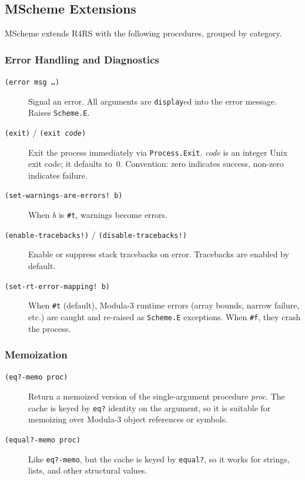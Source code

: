\documentclass[12pt]{report}
\begin{document}
\subsection{MScheme Extensions}\label{sec:extensions}

MScheme extends R4RS with the following procedures, grouped by category.

\subsubsection{Error Handling and Diagnostics}

\nopagebreak[4]
\begin{description}
\item[{\tt (error msg \ldots)}]
  Signal an error.  All arguments are {\tt display}ed into the
  error message.  Raises {\tt Scheme.E}.
\item[{\tt (exit)} / {\tt (exit {\it code})}]
  Exit the process immediately via {\tt Process.Exit}.
  {\it code\/} is an integer Unix exit code; it defaults to~0.
  Convention: zero indicates success, non-zero indicates failure.
\item[{\tt (set-warnings-are-errors!~b)}]
  When {\it b\/} is {\tt \#t}, warnings become errors.
\item[{\tt (enable-tracebacks!)} / {\tt (disable-tracebacks!)}]
  Enable or suppress stack tracebacks on error.
  Tracebacks are enabled by default.
\item[{\tt (set-rt-error-mapping!~b)}]
  When {\tt \#t} (default), Modula-3 runtime errors (array bounds,
  narrow failure, etc.) are caught and re-raised as {\tt Scheme.E}
  exceptions.  When {\tt \#f}, they crash the process.
\end{description}

\subsubsection{Memoization}

\nopagebreak[4]
\begin{description}
\item[{\tt (eq?-memo proc)}]
  Return a memoized version of the single-argument procedure
  {\it proc}.  The cache is keyed by {\tt eq?} identity on the
  argument, so it is suitable for memoizing over Modula-3 object
  references or symbols.
\item[{\tt (equal?-memo proc)}]
  Like {\tt eq?-memo}, but the cache is keyed by {\tt equal?}, so
  it works for strings, lists, and other structural values.
\end{description}
\end{document}
